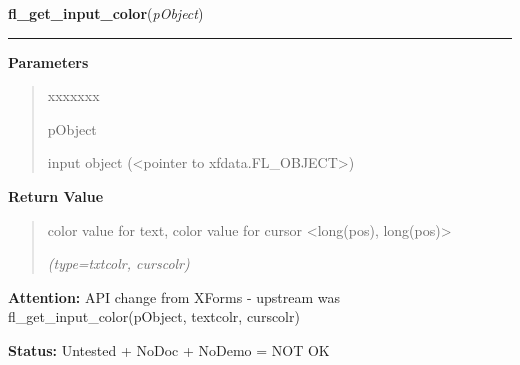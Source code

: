 \hspace{.8\funcindent}\begin{boxedminipage}{\funcwidth}

    \raggedright \textbf{fl\_get\_input\_color}(\textit{pObject})

    \vspace{-1.5ex}

    \rule{\textwidth}{0.5\fboxrule}
\setlength{\parskip}{2ex}
\setlength{\parskip}{1ex}
      \textbf{Parameters}
      \vspace{-1ex}

      \begin{quote}
        \begin{Ventry}{xxxxxxx}

          \item[pObject]

          input object ({\textless}pointer to 
          xfdata.FL\_OBJECT{\textgreater})

        \end{Ventry}

      \end{quote}

      \textbf{Return Value}
    \vspace{-1ex}

      \begin{quote}
      color value for text, color value for cursor {\textless}long(pos), 
      long(pos){\textgreater}

      {\it (type=txtcolr, curscolr)}

      \end{quote}

\textbf{Attention:} API change from XForms - upstream was fl\_get\_input\_color(pObject, 
textcolr, curscolr)



\textbf{Status:} Untested + NoDoc + NoDemo = NOT OK



    \end{boxedminipage}

    \label{xformslib:library:fl_set_input_scroll}

    \vspace{0.5ex}

